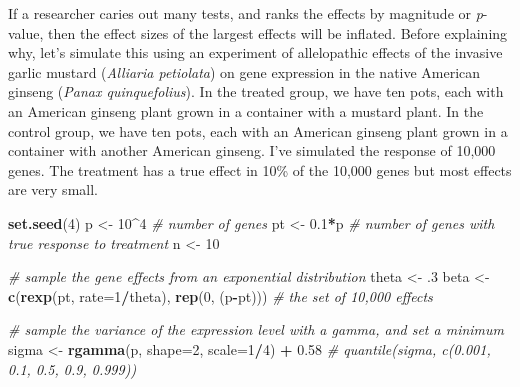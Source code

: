\documentclass[]{book}
\newenvironment{Shaded}{\begin{snugshade}}{\end{snugshade}}
\newcommand{\KeywordTok}[1]{\textcolor[rgb]{0.13,0.29,0.53}{\textbf{#1}}}
\newcommand{\DataTypeTok}[1]{\textcolor[rgb]{0.13,0.29,0.53}{#1}}
\newcommand{\DecValTok}[1]{\textcolor[rgb]{0.00,0.00,0.81}{#1}}
\newcommand{\FloatTok}[1]{\textcolor[rgb]{0.00,0.00,0.81}{#1}}
\newcommand{\StringTok}[1]{\textcolor[rgb]{0.31,0.60,0.02}{#1}}
\newcommand{\CommentTok}[1]{\textcolor[rgb]{0.56,0.35,0.01}{\textit{#1}}}
\newcommand{\OperatorTok}[1]{\textcolor[rgb]{0.81,0.36,0.00}{\textbf{#1}}}
\newcommand{\NormalTok}[1]{#1}
\begin{document}
If a researcher caries out many tests, and ranks the effects by
magnitude or \emph{p}-value, then the effect sizes of the largest
effects will be inflated. Before explaining why, let's simulate this
using an experiment of allelopathic effects of the invasive garlic
mustard (\emph{Alliaria petiolata}) on gene expression in the native
American ginseng (\emph{Panax quinquefolius}). In the treated group, we
have ten pots, each with an American ginseng plant grown in a container
with a mustard plant. In the control group, we have ten pots, each with
an American ginseng plant grown in a container with another American
ginseng. I've simulated the response of 10,000 genes. The treatment has
a true effect in 10\% of the 10,000 genes but most effects are very
small.

\begin{Shaded}
\begin{Highlighting}[]
\KeywordTok{set.seed}\NormalTok{(}\DecValTok{4}\NormalTok{)}
\NormalTok{p <-}\StringTok{ }\DecValTok{10}\OperatorTok{^}\DecValTok{4} \CommentTok{# number of genes}
\NormalTok{pt <-}\StringTok{ }\FloatTok{0.1}\OperatorTok{*}\NormalTok{p }\CommentTok{# number of genes with true response to treatment}
\NormalTok{n <-}\StringTok{ }\DecValTok{10}

\CommentTok{# sample the gene effects from an exponential distribution}
\NormalTok{theta <-}\StringTok{ }\NormalTok{.}\DecValTok{3}
\NormalTok{beta <-}\StringTok{ }\KeywordTok{c}\NormalTok{(}\KeywordTok{rexp}\NormalTok{(pt, }\DataTypeTok{rate=}\DecValTok{1}\OperatorTok{/}\NormalTok{theta),}
          \KeywordTok{rep}\NormalTok{(}\DecValTok{0}\NormalTok{, (p}\OperatorTok{-}\NormalTok{pt))) }\CommentTok{# the set of 10,000 effects}

\CommentTok{# sample the variance of the expression level with a gamma, and set a minimum}
\NormalTok{sigma <-}\StringTok{ }\KeywordTok{rgamma}\NormalTok{(p, }\DataTypeTok{shape=}\DecValTok{2}\NormalTok{, }\DataTypeTok{scale=}\DecValTok{1}\OperatorTok{/}\DecValTok{4}\NormalTok{) }\OperatorTok{+}\StringTok{ }\FloatTok{0.58}
\CommentTok{# quantile(sigma, c(0.001, 0.1, 0.5, 0.9, 0.999))}


\end{Highlighting}
\end{Shaded}
\end{document}
